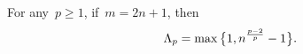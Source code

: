 
\begin{proposition}
    For any~$p \ge 1$, if~$m = 2n + 1$, then
    \begin{equation*}
        \Lambda_p = \max \set[\big]{1, n^{\frac{p - 2}{p}} - 1}.
    \end{equation*}
\end{proposition}


